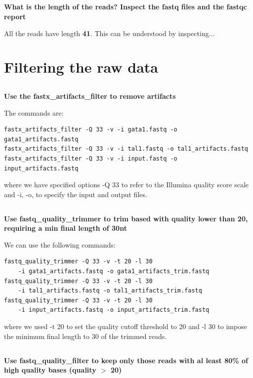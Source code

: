 \documentclass[12pt, a4paper]{article}
\begin{document}
\subsection{}
\textbf{What is the length of the reads? Inspect the fastq files and the fastqc report}

All the reads have length \textbf{41}. This can be understood by inspecting...

\section{Filtering the raw data}

\subsection{}
\textbf{Use the fastx\_artifacts\_filter to remove artifacts}

The commands are:

\begin{verbatim}
fastx_artifacts_filter -Q 33 -v -i gata1.fastq -o gata1_artifacts.fastq
fastx_artifacts_filter -Q 33 -v -i tal1.fastq -o tal1_artifacts.fastq
fastx_artifacts_filter -Q 33 -v -i input.fastq -o input_artifacts.fastq
\end{verbatim}

where we have specified options -Q 33 to refer to the Illumina quality score scale and -i, -o, to specify the input and output files.

\subsection{}
\textbf{Use fastq\_quality\_trimmer to trim based with quality lower than 20, requiring a min final length of 30nt}

We can use the following commands:

\begin{verbatim}
fastq_quality_trimmer -Q 33 -v -t 20 -l 30
    -i gata1_artifacts.fastq -o gata1_artifacts_trim.fastq
fastq_quality_trimmer -Q 33 -v -t 20 -l 30
    -i tal1_artifacts.fastq -o tal1_artifacts_trim.fastq
fastq_quality_trimmer -Q 33 -v -t 20 -l 30
    -i input_artifacts.fastq -o input_artifacts_trim.fastq	
\end{verbatim}

where we used -t 20 to set the quality cutoff threshold to 20 and -l 30 to impose the minimum final length to 30 of the trimmed reads.

\subsection{}
\textbf{Use fastq\_quality\_filter to keep only those reads with al least 80\% of high quality bases (quality $>$ 20)}
\end{document}
